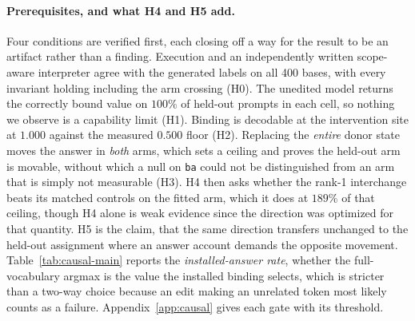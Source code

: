 \documentclass{article}
\begin{document}
\paragraph{Prerequisites, and what H4 and H5 add.}
Four conditions are verified first, each closing off a way for the result to be an artifact rather than a finding. Execution and an independently written scope-aware interpreter agree with the generated labels on all 400 bases, with every invariant holding including the arm crossing (H0). The unedited model returns the correctly bound value on $100\%$ of held-out prompts in each cell, so nothing we observe is a capability limit (H1). Binding is decodable at the intervention site at $1.000$ against the measured $0.500$ floor (H2). Replacing the \emph{entire} donor state moves the answer in \emph{both} arms, which sets a ceiling and proves the held-out arm is movable, without which a null on \texttt{ba} could not be distinguished from an arm that is simply not measurable (H3). H4 then asks whether the rank-1 interchange beats its matched controls on the fitted arm, which it does at $189\%$ of that ceiling, though H4 alone is weak evidence since the direction was optimized for that quantity. H5 is the claim, that the same direction transfers unchanged to the held-out assignment where an answer account demands the opposite movement. Table~\ref{tab:causal-main} reports the \emph{installed-answer rate}, whether the full-vocabulary argmax is the value the installed binding selects, which is stricter than a two-way choice because an edit making an unrelated token most likely counts as a failure. Appendix~\ref{app:causal} gives each gate with its threshold.
\end{document}
